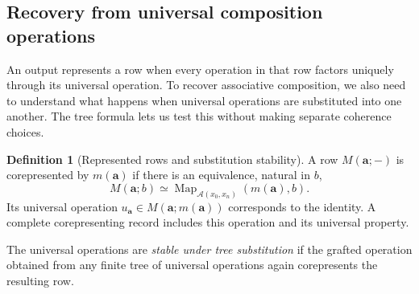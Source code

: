 \documentclass[oneside]{article}
\theoremstyle{plain}
\theoremstyle{definition}
\newtheorem{definition}[theorem]{Definition}
\theoremstyle{remark}
\newcommand{\Map}{\operatorname{Map}}
\begin{document}
\subsection{Recovery from universal composition operations}
\label{subsec:multikernel-recovery}

An output represents a row when every operation in that row factors
uniquely through its universal operation. To recover associative
composition, we also need to understand what happens when universal
operations are substituted into one another. The tree formula lets
us test this without making separate coherence choices.

\begin{definition}[Represented rows and substitution stability]
\label{def:multikernel-representability}
A row $M(\mathbf a;-)$ is corepresented by $m(\mathbf a)$ if
there is an equivalence, natural in $b$,
\begin{equation}\label{eq:multikernel-corepresentation}
 M(\mathbf a;b)\simeq
 \Map_{\mathcal A(x_0,x_n)}(m(\mathbf a),b).
\end{equation}
Its universal operation
$u_{\mathbf a}\in M(\mathbf a;m(\mathbf a))$ corresponds to the
identity. A complete corepresenting record includes this operation
and its universal property.

The universal operations are \emph{stable under tree substitution}
if the grafted operation obtained from any finite tree of universal
operations again corepresents the resulting row.
\end{definition}
\end{document}

